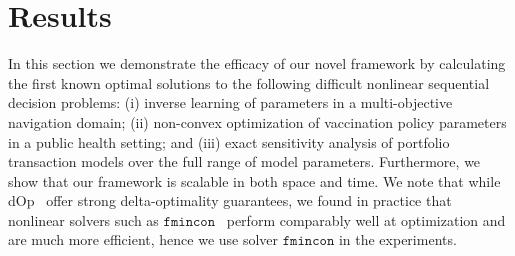 \section{Results}
\label{sec:results}

In this section we demonstrate the efficacy of our novel framework by calculating the first known optimal solutions to the following difficult nonlinear sequential decision problems: (i) inverse learning of parameters in a multi-objective navigation domain; (ii) non-convex optimization of vaccination policy parameters in a public health setting; and (iii) exact sensitivity analysis of portfolio transaction models over the full range of model parameters. Furthermore, we show that our framework is scalable in both space and time. We note that while dOp~\parencite{Gao2013} offer strong delta-optimality guarantees, we found in practice that nonlinear solvers such as $ \mathtt{fmincon} $~\parencite{MATLAB_2010} perform comparably well at optimization and are much more efficient, hence we use solver $ \mathtt{fmincon} $ in the experiments.


